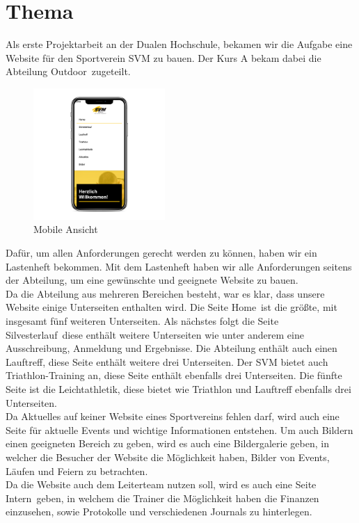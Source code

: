 \documentclass[12pt,a4paper]{article}
\begin{document}
\section{Thema}
Als erste Projektarbeit an der Dualen Hochschule, bekamen wir die Aufgabe eine Website für den Sportverein SVM zu bauen. Der Kurs A bekam dabei die Abteilung \dq Outdoor\dq \ zugeteilt. 
\begin{figure}
  \includegraphics[width=5cm]{iphone.png}
  \caption{Mobile Ansicht}
\end{figure}
Dafür, um allen Anforderungen gerecht werden zu können, haben wir ein Lastenheft bekommen. 
Mit dem Lastenheft haben wir alle Anforderungen seitens der Abteilung, um eine gewünschte und geeignete Website zu bauen.\\
Da die Abteilung aus mehreren Bereichen besteht, war es klar, dass unsere Website einige Unterseiten enthalten wird. Die Seite \dq Home\dq \ ist die größte, mit insgesamt fünf weiteren Unterseiten. Als nächstes folgt die Seite \dq Silvesterlauf\dq \ diese enthält weitere Unterseiten wie unter anderem eine Ausschreibung, Anmeldung und Ergebnisse. Die Abteilung enthält auch einen Lauftreff, diese Seite enthält weitere drei Unterseiten. Der SVM bietet auch Triathlon-Training an, diese Seite enthält ebenfalls drei Unterseiten. Die fünfte Seite ist die Leichtathletik, diese bietet wie Triathlon und Lauftreff ebenfalls drei Unterseiten.\\
Da Aktuelles auf keiner Website eines Sportvereins fehlen darf, wird auch eine Seite für aktuelle Events und wichtige Informationen entstehen. 
Um auch Bildern einen geeigneten Bereich zu geben, wird es auch eine Bildergalerie geben, in welcher die Besucher der Website die Möglichkeit haben, Bilder von Events, Läufen und Feiern zu betrachten. \\
Da die Website auch dem Leiterteam nutzen soll, wird es auch eine Seite \dq Intern\dq \ geben, in welchem die Trainer die Möglichkeit haben die Finanzen einzusehen, sowie Protokolle und verschiedenen Journals zu hinterlegen. 
\end{document}
